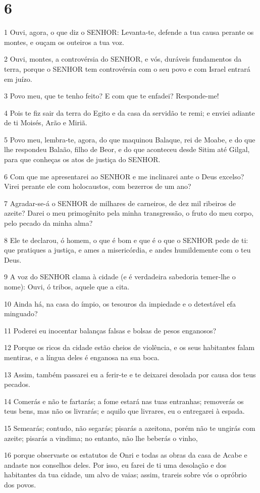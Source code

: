 \chapter{6}

\par 1 Ouvi, agora, o que diz o SENHOR: Levanta-te, defende a tua causa perante os montes, e ouçam os outeiros a tua voz.
\par 2 Ouvi, montes, a controvérsia do SENHOR, e vós, duráveis fundamentos da terra, porque o SENHOR tem controvérsia com o seu povo e com Israel entrará em juízo.
\par 3 Povo meu, que te tenho feito? E com que te enfadei? Responde-me!
\par 4 Pois te fiz sair da terra do Egito e da casa da servidão te remi; e enviei adiante de ti Moisés, Arão e Miriã.
\par 5 Povo meu, lembra-te, agora, do que maquinou Balaque, rei de Moabe, e do que lhe respondeu Balaão, filho de Beor, e do que aconteceu desde Sitim até Gilgal, para que conheças os atos de justiça do SENHOR.
\par 6 Com que me apresentarei ao SENHOR e me inclinarei ante o Deus excelso? Virei perante ele com holocaustos, com bezerros de um ano?
\par 7 Agradar-se-á o SENHOR de milhares de carneiros, de dez mil ribeiros de azeite? Darei o meu primogênito pela minha transgressão, o fruto do meu corpo, pelo pecado da minha alma?
\par 8 Ele te declarou, ó homem, o que é bom e que é o que o SENHOR pede de ti: que pratiques a justiça, e ames a misericórdia, e andes humildemente com o teu Deus.
\par 9 A voz do SENHOR clama à cidade (e é verdadeira sabedoria temer-lhe o nome): Ouvi, ó tribos, aquele que a cita.
\par 10 Ainda há, na casa do ímpio, os tesouros da impiedade e o detestável efa minguado?
\par 11 Poderei eu inocentar balanças falsas e bolsas de pesos enganosos?
\par 12 Porque os ricos da cidade estão cheios de violência, e os seus habitantes falam mentiras, e a língua deles é enganosa na sua boca.
\par 13 Assim, também passarei eu a ferir-te e te deixarei desolada por causa dos teus pecados.
\par 14 Comerás e não te fartarás; a fome estará nas tuas entranhas; removerás os teus bens, mas não os livrarás; e aquilo que livrares, eu o entregarei à espada.
\par 15 Semearás; contudo, não segarás; pisarás a azeitona, porém não te ungirás com azeite; pisarás a vindima; no entanto, não lhe beberás o vinho,
\par 16 porque observaste os estatutos de Onri e todas as obras da casa de Acabe e andaste nos conselhos deles. Por isso, eu farei de ti uma desolação e dos habitantes da tua cidade, um alvo de vaias; assim, trareis sobre vós o opróbrio dos povos.

